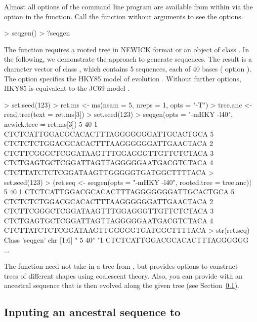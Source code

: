 Almost all options of the command line program  are available from within  via
the option  in the  function.
Call the function without arguments to see the options.
\begin{Code}
> seqgen()
> ?seqgen
\end{Code}

The  function requires a rooted tree in NEWICK format or an object of class .
In the following, we demonstrate the  approach
to generate sequences. The result is a character
vector of class {\color{red} }, which contains 5 sequences, 
each of 40 bases ( option ). The option  specifies the HKY85
model of evolution \citep{Hasegawa1985}.
Without further options, HKY85 is equivalent to the JC69 model \citep{Jukes1969}.
\begin{Code}
> set.seed(123)
> ret.ms <- ms(nsam = 5, nreps = 1, opts = "-T")
> tree.anc <- read.tree(text = ret.ms[3])
> set.seed(123)
> seqgen(opts = "-mHKY -l40", newick.tree = ret.ms[3])
 5 40
1         CTCTCATTGGACGCACACTTTAGGGGGGGATTGCACTGCA
5         CTCTCTCTGGACGCACACTTTAAGGGGGGATTGAACTACA
2         CTCTTCGGGCTCGGATAAGTTTGGAGGGTTGTTCTCTACA
3         CTCTGAGTGCTCGGATTAGTTAGGGGGAATGACGTCTACA
4         CTCTTATCTCTCGGATAAGTTGGGGGTGATGGCTTTTACA
> set.seed(123)
> (ret.seq <- seqgen(opts = "-mHKY -l40", rooted.tree = tree.anc))
 5 40
1         CTCTCATTGGACGCACACTTTAGGGGGGGATTGCACTGCA
5         CTCTCTCTGGACGCACACTTTAAGGGGGGATTGAACTACA
2         CTCTTCGGGCTCGGATAAGTTTGGAGGGTTGTTCTCTACA
3         CTCTGAGTGCTCGGATTAGTTAGGGGGAATGACGTCTACA
4         CTCTTATCTCTCGGATAAGTTGGGGGTGATGGCTTTTACA
> str(ret.seq)
Class 'seqgen'  chr [1:6] " 5 40" "1         CTCTCATTGGACGCACACTTTAGGGGGG ...
\end{Code}

The  function need not take in a tree from ,
but  provides options to construct trees of
different shapes using coalescent theory.
Also, you can provide  with an ancestral sequence that is then evolved along the given tree (see Section~\ref{sec:ancestral}).




\subsection[Inputing an ancestral sequence to ms+seqgen]{Inputing an ancestral sequence to }
\label{sec:ancestral}

